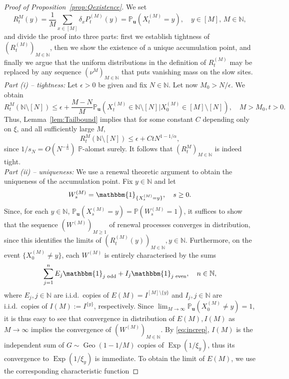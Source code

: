 \documentclass[11pt,a4paper]{scrartcl}
\numberwithin{equation}{section}
\theoremstyle{plain}
\theoremstyle{definition}
\theoremstyle{remark}
\newcommand{\bN}{\ensuremath{\mathbb{N}}}
\newcommand{\bP}{\ensuremath{\mathbb{P}}}
\newcommand{\ind}{\ensuremath{\mathbbm{1}}}
\newcommand{\bPu}{\bP_\mathbf{u}}
\begin{document}
\begin{proof}[Proof of Proposition~\ref{prop:Qexistence}]
We set
$$R_t^{M}(y) = \frac{1}{M}\sum_{x\in[M]} \delta_x P^{(M)}_t(y)=\bPu(X^{(M)}_t=y),  \quad y\in[M],\, M\in\bN,$$
and divide the proof into three parts: first we establish tightness of $(R_t^{(M)})_{M\in\bN}$, then we show the existence of a unique accumulation point, and finally we argue that the uniform distributions in the definition of $R^{(M)}_t$ may be replaced by any sequence $(\nu^M)_{M\in\bN}$ that puts vanishing mass on the slow sites.\\
\noindent\textit{Part (i) -- tightness:} Let $\epsilon>0$ be given and fix $N\in \bN$. Let now $M_0>N/\epsilon$. We obtain
\begin{equation}\label{eq:straff1}
R_t^{M}(\bN\setminus[N])\leq \epsilon + \frac{M-N}{M}\bPu(X^{(M)}_t\in \bN\setminus[N]|X_0^{(M)}\in[M]\setminus[N]), \quad M>M_0, t>0.
\end{equation}
Thus, Lemma~\ref{lem:Tailbound} implies that for some constant $C$ depending only on $\xi$, and all sufficiently large $M$,
\begin{equation}\label{eq:ConeandCtwo}
R_t^{M}(\bN\setminus[N]) \leq  \epsilon + C t N^{1-1/\alpha},
\end{equation}
since $1/s_N=O(N^{-\frac1\alpha})$ $\bP$-alomst surely. It follows that $(R_t^{M})_{M\in\bN}$ is indeed tight.\\ 
\noindent\textit{Part (ii) -- uniqueness:} We use a renewal theoretic argument to obtain the uniqueness of the accumulation point. Fix $y\in \bN$ and let
$$
W_s^{(M)}=\ind_{\{ X^{(M)}_s=y\}}, \quad s\geq 0.
$$
Since, for each $y\in\bN$, $\bP_{\mathbf{u}}(X^{(M)}_s=y)=\bP(W_s^{(M)}=1)$, it suffices to show that the sequence $(W^{(M)})_{M\geq 1}$ of renewal processes converges in distribution, since this identifies the limits of $(R_t^{(M)}(y))_{M\in\bN}, y\in\bN$. Furthermore, on the event $\{X_0^{(M)}\neq y\}$, each $W^{(M)}$ is entirely characterised by the sums
\[
\sum_{j=1}^{n} E_j\ind_{j \text{ odd}}+I_j\ind_{j \text{ even}},\quad n\in\bN, 
\]
where $E_j,j\in\bN$ are i.i.d.\ copies of $E(M)=I^{[M]\setminus\{y\}}$ and $I_j,j\in\bN$ are i.i.d.\ copies of $I(M):=I^{\{y\}}$, respectively. Since $\lim_{M\to\infty}\bP_{\mathbf u}(X_0^{(M)}\neq y)=1$, it is thus easy to see that convergence in distribution of $E(M), I(M)$ as $M\to\infty$ implies the convergence of $(W^{(M)})_{M\in\bN}$. By \eqref{eq:increp}, $I(M)$ is the independent sum of $G\sim\operatorname{Geo}(1-1/M)$ copies of $\operatorname{Exp}(1/\xi_y)$, thus its convergence to $\operatorname{Exp}(1/\xi_y)$ is immediate. To obtain the limit of $E(M)$, we use the corresponding characteristic function

\end{proof}
\end{document}
